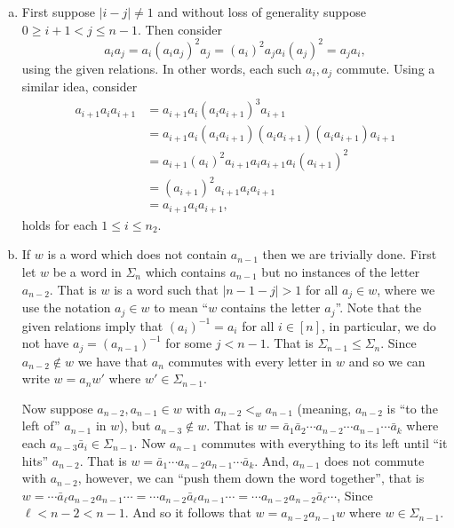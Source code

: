 \documentclass[12pt,letterpaper,boxed]{hmcpset}
\newcommand{\abs}[1]{\left|#1\right|}
\newcommand{\inv}{^{-1}}
\begin{document}
\begin{solution}
\begin{enumerate}[(a)]
\item 
First suppose $\abs{i -j} \neq 1$ and without loss of generality
suppose $0 \geq i+1 < j \leq n-1$. Then consider 
\[
	a_i a_j = a_i (a_ia_j)^2 a_j = (a_i)^2 a_j a_i (a_j)^2 = a_j a_i,
\]
using the given relations. In other words, each such $a_i, a_j$
commute. Using a similar idea, consider 
\begin{align*}
	a_{i+1}a_i a_{i+1} 
		&= a_{i+1} a_i (a_ia_{i+1})^3 a_{i+1} \\
		&= a_{i+1} a_i (a_ia_{i+1}) (a_ia_{i+1})(a_ia_{i+1}) a_{i+1} \\
		&= a_{i+1} (a_i)^2 a_{i+1} a_i a_{i+1} a_i (a_{i+1})^2  \\
	 	&= (a_{i+1})^2 a_{i+1}a_i a_{i+1} \\
	 	&= a_{i+1}a_i a_{i+1}, 
\end{align*}
holds for each $1 \leq i \leq n_2$. 

\item
If $w$ is a word which does not contain $a_{n-1}$ then we are
trivially done. 
First let $w$ be a word in $\Sigma_n$ which contains $a_{n-1}$ but no
instances of the letter $a_{n-2}$. That is $w$ is a word such that
$\abs{n-1 - j} > 1$ for all $a_j \in w$, where we use the notation
$a_j \in w$ to mean ``$w$ contains the letter $a_j$''. Note that the
given relations imply that $(a_i)\inv = a_i$ for all $i \in [n]$, in
particular, we do not have $a_j = (a_{n-1})\inv$ for some $j < n-1$.
That is $\Sigma_{n-1} \leq \Sigma_n$.
Since $a_{n-2} \not\in w$ we have that $a_n$ commutes with every
letter in $w$ and so we can write $w = a_n w'$ where $w' \in
\Sigma_{n-1}$.

Now suppose $a_{n-2}, a_{n-1} \in w$ with $a_{n-2} <_w a_{n-1}$
(meaning, $a_{n-2}$ is ``to the left of'' $a_{n-1}$ in $w$), but
$a_{n-3} \not\in w$. That is $w = \bar a_1 \bar a_2 \cdots a_{n-2}
\cdots a_{n-1} \cdots \bar a_k$ where each $a_{n-3} \bar a_i \in
\Sigma_{n-1}$. Now $a_{n-1}$ commutes with everything to its left
until ``it hits'' $a_{n-2}$. That is $w = \bar a_1 \cdots a_{n-2}
a_{n-1} \cdots \bar a_k$. And, $a_{n-1}$ does not commute with
$a_{n-2}$, however, we can ``push them down the word together'', that
is $w = \cdots \bar a_\ell a_{n-2}a_{n-1} \cdots = \cdots a_{n-2}
\bar a_\ell a_{n-1} \cdots = \cdots a_{n-2}a_{n-2} \bar a_\ell
\cdots$, Since $\ell < n-2 < n-1$. And so it follows that $w =
a_{n-2}a_{n-1} w$ where $w \in \Sigma_{n-1}$.


\end{enumerate}
\end{solution}
\end{document}
